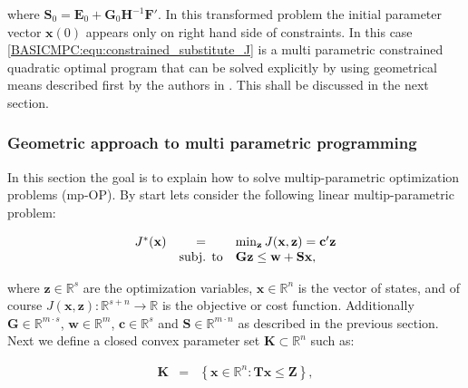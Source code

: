     where $\textbf{S}_0=\textbf{E}_0+\textbf{G}_0\textbf{H}^{-1}\textbf{F}'$. In this transformed problem the initial parameter vector $\textbf{x}(0)$ appears only on right hand side of constraints. In this case \ref{BASICMPC:equ:constrained_substitute_J} is a multi parametric constrained quadratic optimal program that can be solved explicitly by using geometrical means described first by the authors in \cite{bemporad2002explicit}. This shall be discussed in the next section.

    \subsubsection{Geometric approach to multi parametric programming}\label{BASICCSR:sec:MPP}
    
    In this section the goal is to explain how to solve multip-parametric optimization problems (mp-OP). By start lets consider the following linear multip-parametric problem:
    
        \begin{equation}
    \begin{array}{rcl}
            J^*(\textbf{x})&=&\min_{\textbf{z}}J(\textbf{x},\textbf{z})=\textbf{c}'\textbf{z}\\
            &\textnormal{subj. to}&\textbf{Gz}\leq\textbf{w}+\textbf{Sx},
        \end{array}
        \label{BASICMPC:equ:MPP_program}
    \end{equation}
    
    where $\textbf{z}\in\mathbb{R}^s$ are the optimization variables,  $\textbf{x}\in\mathbb{R}^n$ is the vector of states, and of course $J(\textbf{x},\textbf{z}):\mathbb{R}^{s+n}\rightarrow\mathbb{R}$ is the objective or cost function. Additionally $\textbf{G}\in\mathbb{R}^{m\cdot s}$, $\textbf{w}\in\mathbb{R}^m$, $\textbf{c}\in\mathbb{R}^s$ and $\textbf{S}\in\mathbb{R}^{m\cdot n}$ as described in the previous section. Next we define a closed convex parameter set $\textbf{K}\subset\mathbb{R}^n$ such as:
    
    \begin{equation}
    \begin{array}{rcl}
            \textbf{K}&=&\left\{ \textbf{x}\in\mathbb{R}^n:\textbf{Tx}\leq\textbf{Z}\right\},
        \end{array}
        \label{BASICMPC:equ:MPP_parameterset}
    \end{equation}
    
